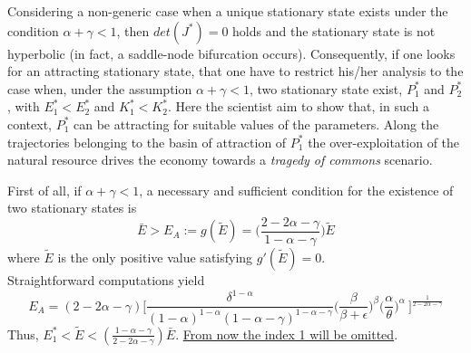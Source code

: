 Considering a non-generic case when a unique stationary state exists under the condition $\alpha+\gamma<1$, then $det(J^*)=0$ holds and the stationary state is not hyperbolic (in fact, a saddle-node bifurcation occurs). Consequently, if one looks for an attracting stationary state, that one have to restrict his/her analysis to the case when, under the assumption $\alpha+\gamma<1$, two stationary state exist, $P_1^*$ and $P_2^*$, with $E_1^* < E_2^*$ and $K_1^* < K_2^*$. Here the scientist aim to show that, in such a context, $P_1^*$ can be attracting for suitable values of the parameters. Along the trajectories belonging to the basin of attraction of $P_1^*$ the over-exploitation of the natural resource drives the economy towards a \textit{tragedy of commons} scenario.

First of all, if $\alpha+\gamma<1$, a necessary and sufficient condition for the existence of two stationary states is
\begin{equation}
	\bar{E}>E_A := g(\tilde{E})=\Bigg(\frac{2-2\alpha-\gamma}{1-\alpha-\gamma}\Bigg) \tilde{E}
\end{equation}
where $\tilde{E}$ is the only positive value satisfying $g'(\tilde{E})=0$. \\
Straightforward computations yield 
\begin{equation}
	E_A =(2-2\alpha-\gamma)\Bigg[\frac{\delta^{1-\alpha}}{(1-\alpha)^{1-\alpha}(1-\alpha-\gamma)^{1-\alpha-\gamma}} \Bigg(\frac{\beta}{\beta+\epsilon}\Bigg)^{\beta} \Bigg(\frac{\alpha}{\theta}\Bigg)^{\alpha}\ \Bigg]^{\frac{1}{2-2\alpha-\gamma}}
\end{equation}
Thus, $E_1^*<\tilde{E}<(\frac{1-\alpha-\gamma}{2-2\alpha-\gamma})\bar{E}$.
\underline{From now the index 1 will be omitted}. 

